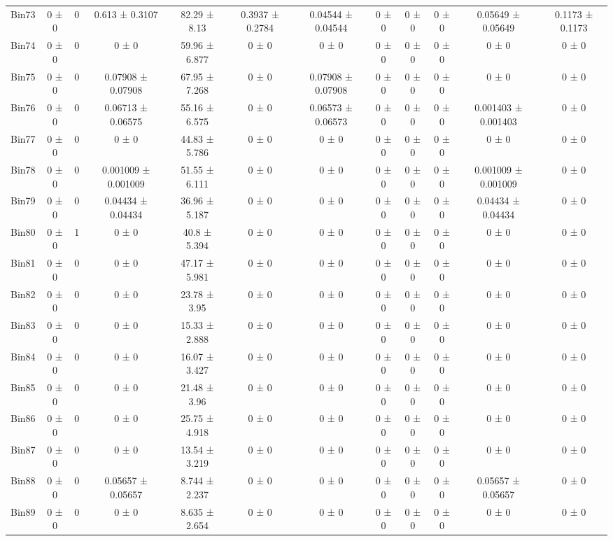 \begin{tabular}{@{\extracolsep{4pt}}lccccccccccc@{}}
     Bin73 & 0 ± 0 & 0 & 0.613 ± 0.3107 & 82.29 ± 8.13 & 0.3937 ± 0.2784 & 0.04544 ± 0.04544 & 0 ± 0 & 0 ± 0 & 0 ± 0 & 0.05649 ± 0.05649 & 0.1173 ± 0.1173 \\ 
     Bin74 & 0 ± 0 & 0 & 0 ± 0 & 59.96 ± 6.877 & 0 ± 0 & 0 ± 0 & 0 ± 0 & 0 ± 0 & 0 ± 0 & 0 ± 0 & 0 ± 0 \\ 
     Bin75 & 0 ± 0 & 0 & 0.07908 ± 0.07908 & 67.95 ± 7.268 & 0 ± 0 & 0.07908 ± 0.07908 & 0 ± 0 & 0 ± 0 & 0 ± 0 & 0 ± 0 & 0 ± 0 \\ 
     Bin76 & 0 ± 0 & 0 & 0.06713 ± 0.06575 & 55.16 ± 6.575 & 0 ± 0 & 0.06573 ± 0.06573 & 0 ± 0 & 0 ± 0 & 0 ± 0 & 0.001403 ± 0.001403 & 0 ± 0 \\ 
     Bin77 & 0 ± 0 & 0 & 0 ± 0 & 44.83 ± 5.786 & 0 ± 0 & 0 ± 0 & 0 ± 0 & 0 ± 0 & 0 ± 0 & 0 ± 0 & 0 ± 0 \\ 
     Bin78 & 0 ± 0 & 0 & 0.001009 ± 0.001009 & 51.55 ± 6.111 & 0 ± 0 & 0 ± 0 & 0 ± 0 & 0 ± 0 & 0 ± 0 & 0.001009 ± 0.001009 & 0 ± 0 \\ 
     Bin79 & 0 ± 0 & 0 & 0.04434 ± 0.04434 & 36.96 ± 5.187 & 0 ± 0 & 0 ± 0 & 0 ± 0 & 0 ± 0 & 0 ± 0 & 0.04434 ± 0.04434 & 0 ± 0 \\ 
     Bin80 & 0 ± 0 & 1 & 0 ± 0 & 40.8 ± 5.394 & 0 ± 0 & 0 ± 0 & 0 ± 0 & 0 ± 0 & 0 ± 0 & 0 ± 0 & 0 ± 0 \\ 
     Bin81 & 0 ± 0 & 0 & 0 ± 0 & 47.17 ± 5.981 & 0 ± 0 & 0 ± 0 & 0 ± 0 & 0 ± 0 & 0 ± 0 & 0 ± 0 & 0 ± 0 \\ 
     Bin82 & 0 ± 0 & 0 & 0 ± 0 & 23.78 ± 3.95 & 0 ± 0 & 0 ± 0 & 0 ± 0 & 0 ± 0 & 0 ± 0 & 0 ± 0 & 0 ± 0 \\ 
     Bin83 & 0 ± 0 & 0 & 0 ± 0 & 15.33 ± 2.888 & 0 ± 0 & 0 ± 0 & 0 ± 0 & 0 ± 0 & 0 ± 0 & 0 ± 0 & 0 ± 0 \\ 
     Bin84 & 0 ± 0 & 0 & 0 ± 0 & 16.07 ± 3.427 & 0 ± 0 & 0 ± 0 & 0 ± 0 & 0 ± 0 & 0 ± 0 & 0 ± 0 & 0 ± 0 \\ 
     Bin85 & 0 ± 0 & 0 & 0 ± 0 & 21.48 ± 3.96 & 0 ± 0 & 0 ± 0 & 0 ± 0 & 0 ± 0 & 0 ± 0 & 0 ± 0 & 0 ± 0 \\ 
     Bin86 & 0 ± 0 & 0 & 0 ± 0 & 25.75 ± 4.918 & 0 ± 0 & 0 ± 0 & 0 ± 0 & 0 ± 0 & 0 ± 0 & 0 ± 0 & 0 ± 0 \\ 
     Bin87 & 0 ± 0 & 0 & 0 ± 0 & 13.54 ± 3.219 & 0 ± 0 & 0 ± 0 & 0 ± 0 & 0 ± 0 & 0 ± 0 & 0 ± 0 & 0 ± 0 \\ 
     Bin88 & 0 ± 0 & 0 & 0.05657 ± 0.05657 & 8.744 ± 2.237 & 0 ± 0 & 0 ± 0 & 0 ± 0 & 0 ± 0 & 0 ± 0 & 0.05657 ± 0.05657 & 0 ± 0 \\ 
     Bin89 & 0 ± 0 & 0 & 0 ± 0 & 8.635 ± 2.654 & 0 ± 0 & 0 ± 0 & 0 ± 0 & 0 ± 0 & 0 ± 0 & 0 ± 0 & 0 ± 0 \\ 

\end{tabular}

